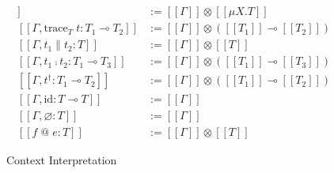 \documentclass[a4j, dvipdfmx]{jsarticle}
\theoremstyle{definition}
\newcommand{\semantics}[1]{[\![ #1 ]\!]}
\begin{document}
\begin{figure}[H]
\begin{minipage}[b]{0.48\columnwidth}
\begin{align*}
      \semantics{\Gamma,\text{fold}_{\mu{X}.T}\;u:\mu{X}.T} &:= \semantics{\Gamma}\otimes\semantics{\mu{X}.T} \\
      \semantics{\Gamma,\text{trace}_T\;t:T_1\multimap{}T_2} &:= \semantics{\Gamma}\otimes(\semantics{T_1}\multimap\semantics{T_2}) \\
      \semantics{\Gamma,t_1\parallel{}t_2:T} &:= \semantics{\Gamma}\otimes\semantics{T} \\
      \semantics{\Gamma,t_1\fcmp{}t_2:T_1\multimap{}T_3} &:= \semantics{\Gamma}\otimes(\semantics{T_1}\multimap\semantics{T_3}) \\
      \semantics{\Gamma,t^\dagger:T_1\multimap{}T_2} &:= \semantics{\Gamma}\otimes(\semantics{T_1}\multimap\semantics{T_2}) \\
      \semantics{\Gamma,\text{id}:T\multimap{}T} &:= \semantics{\Gamma} \\
      \semantics{\Gamma,\varnothing:T} &:= \semantics{\Gamma} \\
      \semantics{f\;\text{@}\;e:T} &:= \semantics{\Gamma}\otimes\semantics{T}
    \end{align*}
    \caption{Context Interpretation}
    \label{fig:cxt_interpret}
  \end{minipage}
\end{figure}
\end{document}
